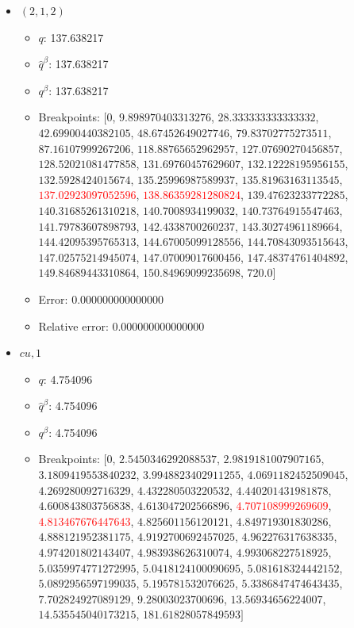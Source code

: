 \documentclass{article}%
\begin{document}
\begin{itemize}
\begin{itemize}
		\item Error: 0.000000000000000%
		\item Relative error: 0.000000000000000%
	\end{itemize}%
	\item $(2, 1, 2)$%
	\begin{itemize}%
		\item $q$: 137.638217%
		\item $\hat{q}^\beta$: 137.638217%
		\item $q^\beta$: 137.638217%
		\item Breakpoints: $[$$0$, $9.898970403313276$, $28.333333333333332$, $42.69900440382105$, $48.67452649027746$, $79.83702775273511$, $87.16107999267206$, $118.88765652962957$, $127.07690270456857$, $128.52021081477858$, $131.69760457629607$, $132.12228195956155$, $132.5928424015674$, $135.25996987589937$, $135.81963163113545$, \textcolor{red}{$137.02923097052596$}, \textcolor{red}{$138.86359281280824$}, $139.47623233772285$, $140.31685261310218$, $140.7008934199032$, $140.73764915547463$, $141.79783607898793$, $142.4338700260237$, $143.30274961189664$, $144.42095395765313$, $144.67005099128556$, $144.70843093515643$, $147.02575214945074$, $147.07009017600456$, $147.48374761404892$, $149.84689443310864$, $150.84969099235698$, $720.0$$]$%
		\item Error: 0.000000000000000%
		\item Relative error: 0.000000000000000%
	\end{itemize}%
	\item $\textit{cu},1$%
	\begin{itemize}%
		\item $q$: 4.754096%
		\item $\hat{q}^\beta$: 4.754096%
		\item $q^\beta$: 4.754096%
		\item Breakpoints: $[$$0$, $2.5450346292088537$, $2.9819181007907165$, $3.1809419553840232$, $3.9948823402911255$, $4.0691182452509045$, $4.269280092716329$, $4.432280503220532$, $4.440201431981878$, $4.600843803756838$, $4.613047202566896$, \textcolor{red}{$4.707108999269609$}, \textcolor{red}{$4.813467676447643$}, $4.825601156120121$, $4.849719301830286$, $4.888121952381175$, $4.9192700692457025$, $4.962276317638335$, $4.974201802143407$, $4.983938626310074$, $4.993068227518925$, $5.0359974771272995$, $5.0418124100090695$, $5.081618324442152$, $5.0892956597199035$, $5.195781532076625$, $5.3386847474643435$, $7.702824927089129$, $9.28003023700696$, $13.56934656224007$, $14.535545040173215$, $181.61828057849593$$]$%

\end{itemize}
\end{itemize}
\end{document}
